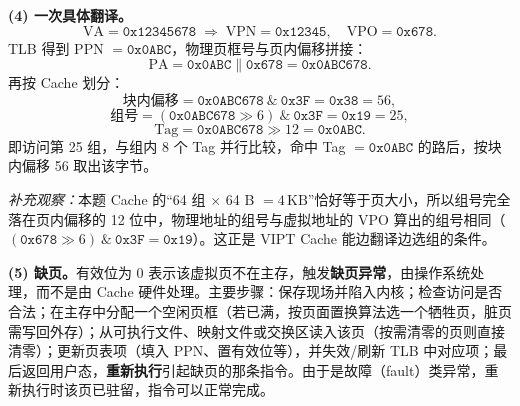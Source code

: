 \begin{enumerate}[leftmargin=*]
\textbf{(4) 一次具体翻译。}
\[
\text{VA}=\mathtt{0x12345678}\;\Rightarrow\;\text{VPN}=\mathtt{0x12345},\quad \text{VPO}=\mathtt{0x678}.
\]
TLB 得到 PPN $=\mathtt{0x0ABC}$，物理页框号与页内偏移拼接：
\[
\text{PA}=\mathtt{0x0ABC}\parallel\mathtt{0x678}=\mathtt{0x0ABC678}.
\]
再按 Cache 划分：
\[
\text{块内偏移}=\mathtt{0x0ABC678}\ \&\ \mathtt{0x3F}=\mathtt{0x38}=56,
\]
\[
\text{组号}=(\mathtt{0x0ABC678}\gg 6)\ \&\ \mathtt{0x3F}=\mathtt{0x19}=25,
\]
\[
\text{Tag}=\mathtt{0x0ABC678}\gg 12=\mathtt{0x0ABC}.
\]
即访问第 25 组，与组内 8 个 Tag 并行比较，命中 Tag $=\mathtt{0x0ABC}$ 的路后，按块内偏移 56 取出该字节。

\emph{补充观察：}本题 Cache 的“64 组 $\times$ 64 B $=4\,\mathrm{KB}$”恰好等于页大小，所以组号完全落在页内偏移的 12 位中，物理地址的组号与虚拟地址的 VPO 算出的组号相同（$(\mathtt{0x678}\gg6)\ \&\ \mathtt{0x3F}=\mathtt{0x19}$）。这正是 VIPT Cache 能边翻译边选组的条件。

\textbf{(5) 缺页。}有效位为 0 表示该虚拟页不在主存，触发\textbf{缺页异常}，由操作系统处理，而不是由 Cache 硬件处理。主要步骤：保存现场并陷入内核；检查访问是否合法；在主存中分配一个空闲页框（若已满，按页面置换算法选一个牺牲页，脏页需写回外存）；从可执行文件、映射文件或交换区读入该页（按需清零的页则直接清零）；更新页表项（填入 PPN、置有效位等），并失效/刷新 TLB 中对应项；最后返回用户态，\textbf{重新执行}引起缺页的那条指令。由于是故障（fault）类异常，重新执行时该页已驻留，指令可以正常完成。\par\noindent{}\else \answerarea[14] \fi

\end{enumerate}
